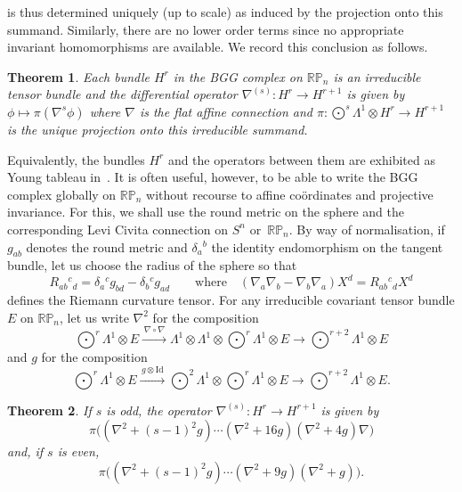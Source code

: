 \documentclass[11pt]{article}
\newtheorem{theorem}{Theorem}
\begin{document}
is thus determined uniquely (up to scale) as induced by the projection onto
this summand. Similarly, there are no lower order terms since no appropriate
invariant homomorphisms are available. We record this conclusion as follows.
\begin{theorem}
Each bundle $H^r$ in the BGG complex on ${\mathbb{RP}}_n$ is an irreducible
tensor bundle and the differential operator $\nabla^{(s)}:H^r\to H^{r+1}$ is
given by $\phi\mapsto\pi(\nabla^s\phi)$ where $\nabla$ is the flat affine
connection and $\pi:\bigodot^s\!\Lambda^1\otimes H^r\to H^{r+1}$ is the unique
projection onto this irreducible summand.
\end{theorem}
Equivalently, the bundles $H^r$ and the operators between them are exhibited as
Young tableau in~\cite{eProjective}. It is often useful, however, to be
able to write the BGG complex globally on ${\mathbb{RP}}_n$ without recourse to
af\/f\/ine co\"ordinates and projective invariance. For this, we shall use the
round metric on the sphere and the corresponding Levi Civita connection on
$S^n$ or~${\mathbb{RP}}_n$. By way of normalisation, if $g_{ab}$ denotes the
round metric and $\delta_a{}^b$ the identity endomorphism on the tangent
bundle, let us choose the radius of the sphere so that
\begin{equation}\label{cc}
R_{ab}{}^c{}_d=\delta_a{}^cg_{bd}-\delta_b{}^cg_{ad}\qquad\mbox{where}\quad
(\nabla_a\nabla_b-\nabla_b\nabla_a)X^d=R_{ab}{}^c{}_dX^d\end{equation}
def\/ines the Riemann curvature tensor. For any irreducible covariant tensor
bundle $E$ on ${\mathbb{RP}}_n$, let us write $\nabla^2$ for the composition
\[\textstyle\bigodot^r\!\Lambda^1\otimes E\xrightarrow{\,\nabla\circ\nabla\,}
\Lambda^1\otimes\Lambda^1\otimes\bigodot^r\!\Lambda^1\otimes E\to
\bigodot^{r+2}\!\Lambda^1\otimes E\]
and $g$ for the composition
\[\textstyle\bigodot^r\!\Lambda^1\otimes E
\xrightarrow{\,g\otimes{\mathrm{Id}}\,}
\bigodot^2\!\Lambda^1\otimes\bigodot^r\!\Lambda^1\otimes E\to
\bigodot^{r+2}\!\Lambda^1\otimes E.\]
\begin{theorem}\label{round_formulae}
If $s$ is odd, the operator $\nabla^{(s)}:H^r\to H^{r+1}$ is given by
\[\pi\big((\nabla^2+(s-1)^2g)\cdots(\nabla^2+16g)(\nabla^2+4g)\nabla\big)\]
and, if $s$ is even,
\[\pi\big((\nabla^2+(s-1)^2g)\cdots(\nabla^2+9g)(\nabla^2+g)\big).\]
\end{theorem}
\end{document}
